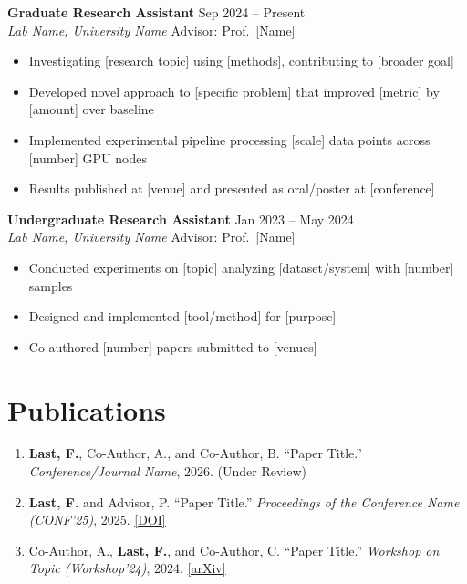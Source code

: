 \documentclass[11pt,letterpaper]{article}
\begin{document}
\textbf{Graduate Research Assistant} \hfill Sep 2024 -- Present \\
\textit{Lab Name, University Name} \hfill Advisor: Prof.\ [Name]
\begin{itemize}
    \item Investigating [research topic] using [methods], contributing to [broader goal]
    \item Developed novel approach to [specific problem] that improved [metric] by [amount] over baseline
    \item Implemented experimental pipeline processing [scale] data points across [number] GPU nodes
    \item Results published at [venue] and presented as oral/poster at [conference]
\end{itemize}

\vspace{4pt}
\textbf{Undergraduate Research Assistant} \hfill Jan 2023 -- May 2024 \\
\textit{Lab Name, University Name} \hfill Advisor: Prof.\ [Name]
\begin{itemize}
    \item Conducted experiments on [topic] analyzing [dataset/system] with [number] samples
    \item Designed and implemented [tool/method] for [purpose]
    \item Co-authored [number] papers submitted to [venues]
\end{itemize}

\section{Publications}


\begin{enumerate}
    \item \textbf{Last, F.}, Co-Author, A., and Co-Author, B. ``Paper Title.'' \textit{Conference/Journal Name}, 2026. (Under Review)

    \item \textbf{Last, F.} and Advisor, P. ``Paper Title.'' \textit{Proceedings of the Conference Name (CONF'25)}, 2025. \href{https://doi.org/XXXXX}{[DOI]}

    \item Co-Author, A., \textbf{Last, F.}, and Co-Author, C. ``Paper Title.'' \textit{Workshop on Topic (Workshop'24)}, 2024. \href{https://arxiv.org/abs/XXXXX}{[arXiv]}
\end{enumerate}
\end{document}
